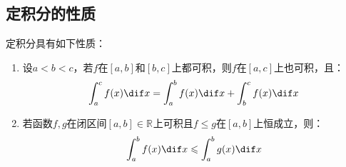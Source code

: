 \subsection{定积分的性质}
\begin{property}
	定积分具有如下性质：
	\begin{enumerate}
		\item 设$a<b<c$，若$f$在$[a,b]$和$[b,c]$上都可积，则$f$在$[a,c]$上也可积，且：
		\begin{equation*}
			\int_{a}^cf(x)\dif x=\int_{a}^bf(x)\dif x+\int_{b}^cf(x)\dif x
		\end{equation*}
		\item 若函数$f,g$在闭区间$[a,b]\in\mathbb{R}^{}$上可积且$f\leqslant g$在$[a,b]$上恒成立，则：
		\begin{equation*}
			\int_{a}^bf(x)\dif x\leqslant\int_{a}^bg(x)\dif x
		\end{equation*}
	\end{enumerate}
\end{property}
